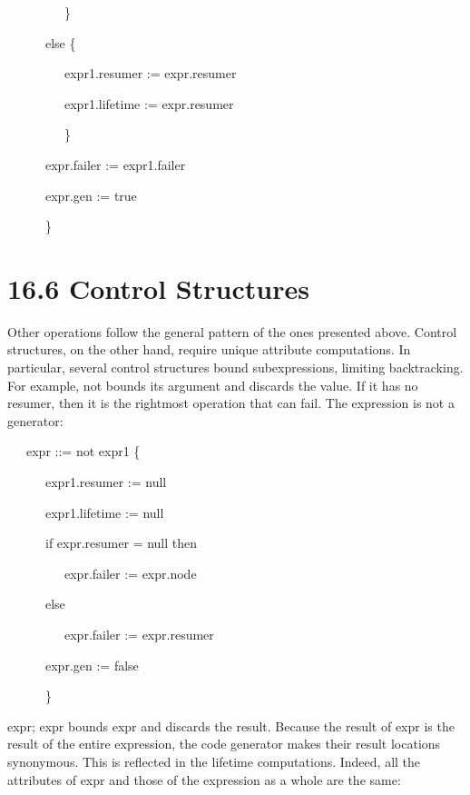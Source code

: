 {\ttfamily\mdseries
\ \ \ \ \ \ \ \ \ \}}

{\ttfamily\mdseries
\ \ \ \ \ \ else \{}

{\ttfamily\mdseries
\ \ \ \ \ \ \ \ \ expr1.resumer := expr.resumer}

{\ttfamily\mdseries
\ \ \ \ \ \ \ \ \ expr1.lifetime := expr.resumer}

{\ttfamily\mdseries
\ \ \ \ \ \ \ \ \ \}}

{\ttfamily\mdseries
\ \ \ \ \ \ expr.failer := expr1.failer}

{\ttfamily\mdseries
\ \ \ \ \ \ expr.gen := true}

{\ttfamily\mdseries
\ \ \ \ \ \ \}}


\section[16.6 Control Structures]{16.6 Control Structures}

Other operations follow the general pattern of the ones presented
above. Control structures, on the other hand, require unique attribute
computations. In particular, several control structures bound
subexpressions, limiting backtracking.  For example, not bounds its
argument and discards the value. If it has no resumer, then it is the
rightmost operation that can fail. The expression is not a generator:

{\ttfamily\mdseries
\ \ \ expr ::= not expr1 \{}

{\ttfamily\mdseries
\ \ \ \ \ \ expr1.resumer := null}

{\ttfamily\mdseries
\ \ \ \ \ \ expr1.lifetime := null}

{\ttfamily\mdseries
\ \ \ \ \ \ if expr.resumer = null then}

{\ttfamily\mdseries
\ \ \ \ \ \ \ \ \ expr.failer := expr.node}

{\ttfamily\mdseries
\ \ \ \ \ \ else}

{\ttfamily\mdseries
\ \ \ \ \ \ \ \ \ expr.failer := expr.resumer}

{\ttfamily\mdseries
\ \ \ \ \ \ expr.gen := false}

{\ttfamily\mdseries
\ \ \ \ \ \ \}}


expr; expr bounds
expr and discards the result. Because the result of
expr is the result of the entire expression, the code
generator makes their result locations synonymous. This is reflected
in the lifetime computations. Indeed, all the attributes of
expr and those of the expression as a whole are the
same:

